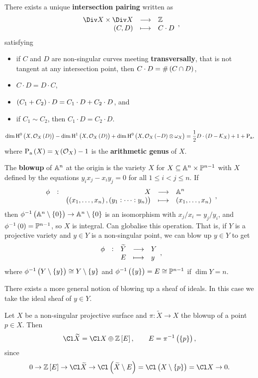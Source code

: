\begin{theorem}
There exists a unique \textbf{intersection pairing} written as
$$ \function{\Div X \times \Div X}{\ZZ}{\br{C, D}}{C \cdot D}, $$
satisfying
\begin{itemize}
\item if $ C $ and $ D $ are non-singular curves meeting \textbf{transversally}, that is not tangent at any intersection point, then $ C \cdot D = \#\br{C \cap D} $,
\item $ C \cdot D = D \cdot C $,
\item $ \br{C_1 + C_2} \cdot D = C_1 \cdot D + C_2 \cdot D $, and
\item if $ C_1 \sim C_2 $, then $ C_1 \cdot D = C_2 \cdot D $.
\end{itemize}
\end{theorem}

\begin{theorem}
$$ \dim \H^0\br{X, \OOO_X\br{D}} - \dim \H^1\br{X, \OOO_X\br{D}} + \dim \H^0\br{X, \OOO_X\br{-D} \otimes \omega_X} = \dfrac{1}{2}D \cdot \br{D - \KKK_X} + 1 + \P_\a, $$
where $ \P_\a\br{X} = \chi\br{\OOO_X} - 1 $ is the \textbf{arithmetic genus} of $ X $.
\end{theorem}

\pagebreak

The \textbf{blowup} of $ \AA^n $ at the origin is the variety $ X $ for $ X \subseteq \AA^n \times \PP^{n - 1} $ with $ X $ defined by the equations $ y_ix_j - x_iy_j = 0 $ for all $ 1 \le i < j \le n $. If
$$ \function[\phi]{X}{\AA^n}{\br{\br{x_1, \dots, x_n}, \br{y_1 : \dots : y_n}}}{\br{x_1, \dots, x_n}}, $$
then $ \phi^{-1}\br{\AA^n \setminus \cbr{0}} \to \AA^n \setminus \cbr{0} $ is an isomorphism with $ x_j / x_i = y_j / y_i $, and $ \phi^{-1}\br{0} = \PP^{n - 1} $, so $ X $ is integral. Can globalise this operation. That is, if $ Y $ is a projective variety and $ y \in Y $ is a non-singular point, we can blow up $ y \in Y $ to get
$$ \function[\phi]{\widetilde{Y}}{Y}{E}{y}, $$
where $ \phi^{-1}\br{Y \setminus \cbr{y}} \cong Y \setminus \cbr{y} $ and $ \phi^{-1}\br{\cbr{y}} = E \cong \PP^{n - 1} $ if $ \dim Y = n $.

\begin{remark*}
There exists a more general notion of blowing up a sheaf of ideals. In this case we take the ideal sheaf of $ y \in Y $.
\end{remark*}

Let $ X $ be a non-singular projective surface and $ \pi : \widetilde{X} \to X $ the blowup of a point $ p \in X $. Then
$$ \Cl \widetilde{X} = \Cl X \oplus \ZZ\sbr{E}, \qquad E = \pi^{-1}\br{\cbr{p}}, $$
since
$$ 0 \to \ZZ\sbr{E} \to \Cl \widetilde{X} \to \Cl \br{\widetilde{X} \setminus E} = \Cl \br{X \setminus \cbr{p}} = \Cl X \to 0. $$

